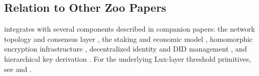 \subsection{Relation to Other Zoo Papers}

\TChain{} integrates with several components described in companion papers: the network topology and consensus layer \cite{zoo-network-architecture}, the staking and economic model \cite{zoo-tokenomics}, homomorphic encryption infrastructure \cite{zoo-fhe}, decentralized identity and DID management \cite{zoo-identity-chain}, and hierarchical key derivation \cite{zoo-key-management}. For the underlying Lux-layer threshold primitives, see \cite{lux-threshold-sigs} and \cite{lux-mchain-mpc}.

